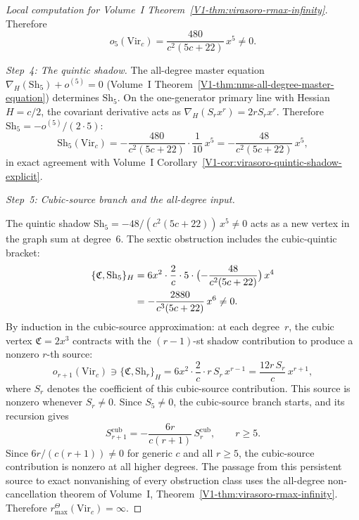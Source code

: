 \begin{proof}[Local computation for Volume~I Theorem~\textup{\ref{V1-thm:virasoro-rmax-infinity}}]
Therefore
\begin{equation}%
o_5(\mathrm{Vir}_c) =
\frac{480}{c^2(5c+22)}\,x^5 \neq 0.
\end{equation}

\emph{Step~4: The quintic shadow.}
The all-degree master equation
$\nabla_H(\mathrm{Sh}_5) + o^{(5)} = 0$
(Volume~I Theorem~\ref{V1-thm:nms-all-degree-master-equation})
determines $\mathrm{Sh}_5$. On the one-generator primary
line with Hessian $H = c/2$, the covariant derivative
acts as $\nabla_H(S_r x^r) = 2rS_r x^r$. Therefore
$\mathrm{Sh}_5 = -o^{(5)}/(2 \cdot 5)$:
\begin{equation}%
\mathrm{Sh}_5(\mathrm{Vir}_c)
= -\frac{480}{c^2(5c+22)} \cdot \frac{1}{10}\,x^5
= -\frac{48}{c^2(5c+22)}\,x^5,
\end{equation}
in exact agreement with Volume~I
Corollary~\ref{V1-cor:virasoro-quintic-shadow-explicit}.

\medskip
\emph{Step~5: Cubic-source branch and the all-degree input.}

The quintic shadow
$\mathrm{Sh}_5 = -48/(c^2(5c+22))\,x^5 \neq 0$
acts as a new vertex in the graph sum at degree~$6$.
The sextic obstruction includes the cubic-quintic bracket:
\begin{align}
\{\mathfrak{C}, \mathrm{Sh}_5\}_H
&= 6x^2 \cdot \frac{2}{c} \cdot
 5\cdot\bigl(-\frac{48}{c^2(5c+22)}\bigr)\,x^4
 \notag \\
&= -\frac{2880}{c^3(5c+22)}\,x^6
\neq 0. %
\end{align}
By induction in the cubic-source approximation: at each degree~$r$, the
cubic vertex
$\mathfrak{C} = 2x^3$ contracts with the $(r{-}1)$-st
shadow contribution to produce a nonzero $r$-th source:
\begin{equation}%
o_{r+1}(\mathrm{Vir}_c) \ni
\{\mathfrak{C}, \mathrm{Sh}_r\}_H
= 6x^2 \cdot \frac{2}{c} \cdot r\,S_r\,x^{r-1}
= \frac{12r\,S_r}{c}\,x^{r+1},
\end{equation}
where $S_r$ denotes the coefficient of this cubic-source contribution.
This source is nonzero whenever $S_r \neq 0$. Since $S_5 \neq 0$, the
cubic-source branch starts, and its recursion gives
\begin{equation}%
S_{r+1}^{\mathrm{cub}} =
-\frac{6r}{c(r+1)}\,S_r^{\mathrm{cub}},
\qquad r \geq 5.
\end{equation}
Since $6r/(c(r+1)) \neq 0$ for generic $c$ and all
$r \geq 5$, the cubic-source contribution is nonzero at all higher
degrees. The passage from this persistent source to exact nonvanishing
of every obstruction class uses the all-degree non-cancellation theorem
of Volume~I, Theorem~\ref{V1-thm:virasoro-rmax-infinity}. Therefore
\(r^\Theta_{\max}(\mathrm{Vir}_c)=\infty\).
\end{proof}


